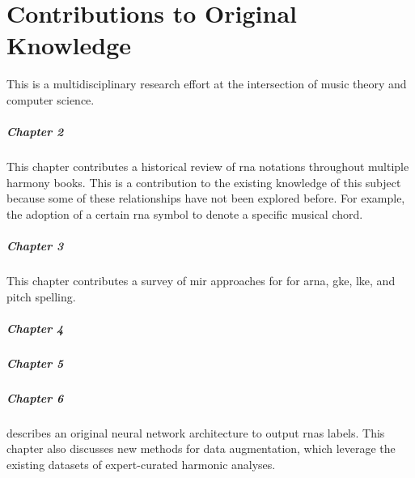 \chapter*{Contributions to Original Knowledge}
\label{chap:contributionstoknowledge}

This \thesisdiss{} is a multidisciplinary research effort at
the intersection of music theory and computer science.

\paragraph{Chapter 2}

This chapter contributes a historical review of \gls{rna}
notations throughout multiple harmony books. This is a
contribution to the existing knowledge of this subject
because some of these relationships have not been explored
before. For example, the adoption of a certain \gls{rna}
symbol to denote a specific musical chord.

\paragraph{Chapter 3}

This chapter contributes a survey of \gls{mir} approaches
for for \gls{arna}, \gls{gke}, \gls{lke}, and pitch
spelling. 

\paragraph{Chapter 4}
\paragraph{Chapter 5}
\paragraph{Chapter 6}




 describes an original neural network
architecture to output \glspl{rna} labels. This chapter also
discusses new methods for data augmentation, which leverage
the existing datasets of expert-curated harmonic analyses.
